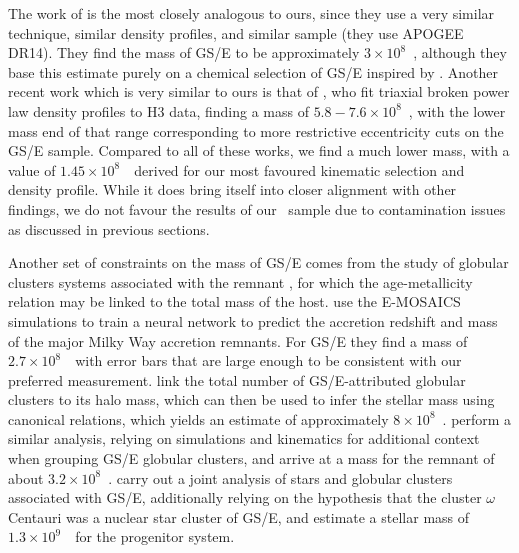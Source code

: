 The work of \cite{mackereth20} is the most closely analogous to ours, since they use a very similar technique, similar density profiles, and similar sample (they use APOGEE DR14). They find the mass of GS/E to be approximately $3\times10^{8}$~\Msun, although they base this estimate purely on a chemical selection of GS/E inspired by \textcite{mackereth19a}. Another recent work which is very similar to ours is that of \textcite{han22}, who fit triaxial broken power law density profiles to H3 data, finding a mass of $5.8-7.6\times10^{8}$~\Msun, with the lower mass end of that range corresponding to more restrictive eccentricity cuts on the GS/E sample. Compared to all of these works, we find a much lower mass, with a value of $1.45\times10^{8}$~\Msun\ derived for our most favoured kinematic selection and density profile. While it does bring itself into closer alignment with other findings, we do not favour the results of our \JRLz\ sample due to contamination issues as discussed in previous sections.

Another set of constraints on the mass of GS/E comes from the study of globular clusters systems associated with the remnant \parencite[as tabulated by e.g.][]{myeong18,massari19}, for which the age-metallicity relation may be linked to the total mass of the host. \textcite{kruijssen20} use the E-MOSAICS simulations to train a neural network to predict the accretion redshift and mass of the major Milky Way accretion remnants. For GS/E they find a mass of $2.7\times 10^{8}$~\Msun\ with error bars that are large enough to be consistent with our preferred measurement. \textcite{forbes20} link the total number of GS/E-attributed globular clusters to its halo mass, which can then be used to infer the stellar mass using canonical relations, which yields an estimate of approximately $8\times10^{8}$~\Msun . \textcite{callingham22} perform a similar analysis, relying on simulations and kinematics for additional context when grouping GS/E globular clusters, and arrive at a mass for the remnant of about $3.2\times10^{8}$~\Msun. \textcite{limberg22} carry out a joint analysis of stars and globular clusters associated with GS/E, additionally relying on the hypothesis that the cluster $\omega$ Centauri was a nuclear star cluster of GS/E, and estimate a stellar mass of $1.3\times 10^{9}$~\Msun\ for the progenitor system.

